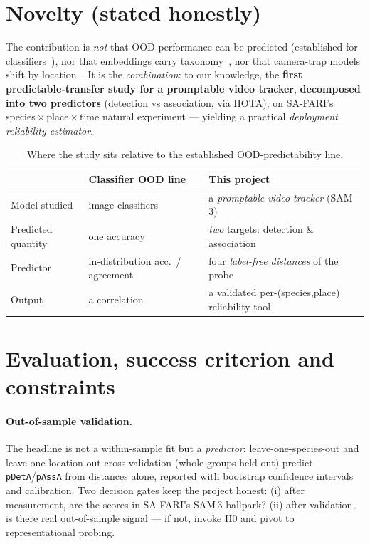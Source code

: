 \documentclass[11pt]{article}
\begin{document}
\section{Novelty (stated honestly)}
The contribution is \emph{not} that OOD performance can be predicted (established for
classifiers~\cite{aotl,agl}), nor that embeddings carry taxonomy~\cite{bioclip}, nor that camera-trap
models shift by location~\cite{terra}. It is the \emph{combination}: to our knowledge, the \textbf{first
predictable-transfer study for a promptable video tracker}, \textbf{decomposed into two predictors}
(detection vs association, via HOTA), on SA-FARI's species\,$\times$\,place\,$\times$\,time natural
experiment --- yielding a practical \emph{deployment reliability estimator}.
\begin{table}[h]
\centering\small
\begin{tabular}{@{}lll@{}}
\toprule
 & \textbf{Classifier OOD line}~\cite{aotl,agl} & \textbf{This project} \\
\midrule
Model studied     & image classifiers                & a \emph{promptable video tracker} (SAM\,3) \\
Predicted quantity & one accuracy                    & \emph{two} targets: detection \& association \\
Predictor         & in-distribution acc.\ / agreement & four \emph{label-free distances} of the probe \\
Output            & a correlation                    & a validated per-(species,place) reliability tool \\
\bottomrule
\end{tabular}
\caption{Where the study sits relative to the established OOD-predictability line.}
\label{tab:novelty}
\end{table}

\section{Evaluation, success criterion and constraints}
\paragraph{Out-of-sample validation.} The headline is not a within-sample fit but a \emph{predictor}:
leave-one-species-out and leave-one-location-out cross-validation (whole groups held out) predict
\texttt{pDetA}/\texttt{pAssA} from distances alone, reported with bootstrap confidence intervals and
calibration. Two decision gates keep the project honest: (i) after measurement, are the scores in
SA-FARI's SAM\,3 ballpark? (ii) after validation, is there real out-of-sample signal --- if not, invoke
H0 and pivot to representational probing.
\end{document}
